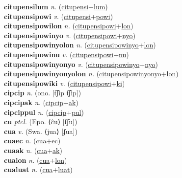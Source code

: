 \textbf{citupensilum} \textit{n.} (\hyperref[citupensi]{citupensi}+\hyperref[lum]{lum})
 \label{citupensilum} \\
\textbf{citupensipowi} \textit{v.} (\hyperref[citupensi]{citupensi}+\hyperref[powi]{powi})
 \label{citupensipowi} \\
\textbf{citupensipowilon} \textit{n.} (\hyperref[citupensipowi]{citupensipowi}+\hyperref[lon]{lon})
 \label{citupensipowilon} \\
\textbf{citupensipowinyo} \textit{v.} (\hyperref[citupensipowi]{citupensipowi}+\hyperref[nyo]{nyo})
 \label{citupensipowinyo} \\
\textbf{citupensipowinyolon} \textit{n.} (\hyperref[citupensipowinyo]{citupensipowinyo}+\hyperref[lon]{lon})
 \label{citupensipowinyolon} \\
\textbf{citupensipowinu} \textit{v.} (\hyperref[citupensipowi]{citupensipowi}+\hyperref[nu]{nu})
 \label{citupensipowinu} \\
\textbf{citupensipowinyonyo} \textit{v.} (\hyperref[citupensipowinyo]{citupensipowinyo}+\hyperref[nyo]{nyo})
 \label{citupensipowinyonyo} \\
\textbf{citupensipowinyonyolon} \textit{n.} (\hyperref[citupensipowinyonyo]{citupensipowinyonyo}+\hyperref[lon]{lon})
 \label{citupensipowinyonyolon} \\
\textbf{citupensipowiki} \textit{v.} (\hyperref[citupensipowi]{citupensipowi}+\hyperref[ki]{ki})
 \label{citupensipowiki} \\
\textbf{cipcip} \textit{n.} (ono. [t͡ʃip t͡ʃip])
 \label{cipcip} \\
\textbf{cipcipak} \textit{n.} (\hyperref[cipcip]{cipcip}+\hyperref[ak]{ak})
 \label{cipcipak} \\
\textbf{cipcippul} \textit{n.} (\hyperref[cipcip]{cipcip}+\hyperref[pul]{pul})
 \label{cipcippul} \\
\textbf{cu} \textit{ptcl.} (Epo. ⟨ĉu⟩ [t͡ʃu])
 \label{cu} \\
\textbf{cua} \textit{v.} (Swa. ⟨jua⟩ [ʄua])
 \label{cua} \\
\textbf{cuaec} \textit{n.} (\hyperref[cua]{cua}+\hyperref[ec]{ec})
 \label{cuaec} \\
\textbf{cuaak} \textit{n.} (\hyperref[cua]{cua}+\hyperref[ak]{ak})
 \label{cuaak} \\
\textbf{cualon} \textit{n.} (\hyperref[cua]{cua}+\hyperref[lon]{lon})
 \label{cualon} \\
\textbf{cualuat} \textit{n.} (\hyperref[cua]{cua}+\hyperref[luat]{luat})
 \label{cualuat} \\
